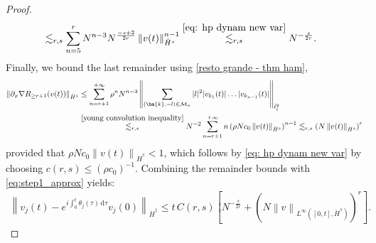 \documentclass[a4paper,10pt,reqno]{article}
\theoremstyle{definition}
\theoremstyle{plain}
\theoremstyle{plain}
\theoremstyle{definition}
\theoremstyle{plain}
\theoremstyle{plain}
\theoremstyle{plain}
\theoremstyle{definition}
\theoremstyle{definition}
\newcommand{\norm}[1]{\left\lVert #1 \right\rVert}
\def \M{\mathcal{M}}
\def \k{\bm{k}}
\begin{document}
\begin{proof}
\[\begin{split}
&\lesssim_{r,s} \sum_{n=5}^r N^{n-3} N^{\frac{-s+2}{2r}} \norm{v(t)}_{\dot{H}^s}^{n-1}
\stackrel{\eqref{eq: hp dynam new var}}{\lesssim_{r,s}} N^{-\frac{s}{2r}}.
\end{split}
\]
Finally, we bound the last remainder using \eqref{resto grande - thm ham},
\[
\begin{split}
\norm{\partial_x \nabla R_{\ge r+1}(v(t))}_{\dot{H}^1} & \le  \sum_{n = r+1}^{+\infty} \rho^n N^{n-3} \norm{\sum_{(\k,-l) \in \M_{n}} |l|^2 |v_{k_1}(t)| \ldots |v_{k_{n-1}}(t)|}_{\dot{\ell}_l^2} \\
& \stackrel{\eqref{young convolution inequality}}{\lesssim_{r,s}} N^{-2} \sum_{n = r+1}^{+\infty} n \left ( \rho N c_0 \norm{v(t)}_{\dot{H}^s} \right )^{n-1} \lesssim_{r,s} \left ( N \norm{v(t)}_{\dot{H}^s} \right )^r
\end{split}
\]
provided that $\rho N c_0 \norm{v(t)}_{\dot{H}^s} < 1$, which follows by \eqref{eq: hp dynam new var} by choosing $c(r,s)\leq (\rho c_0)^{-1}$. Combining the remainder bounds with \eqref{eq:step1_approx} yields:
\begin{equation} \label{eq:step2_approx}
\begin{split}
\norm{v_j(t) - e^{i \int_0^t \theta_j(\tau) \, \mathrm{d} \tau}v_j(0)}_{\dot{H}^1} \le t \, C(r,s) \left [ N^{-\frac{s}{2r}} + \left ( N \norm{v}_{L^{\infty}([0,t],\dot{H}^s)} \right )^r \right ].
\end{split}
\end{equation}

\medskip


\end{proof}
\end{document}
